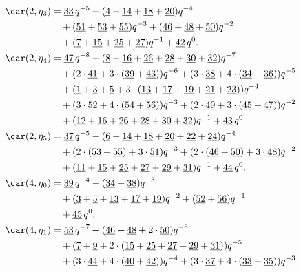 \begin{align*}
	\car(2,\eta_{3})
	&=\underline{33}\,q^{-5}+(\underline{4}+\underline{14}+\underline{18}+\underline{20})q^{-4}\\
	&\quad+(\underline{51}+\underline{53}+\underline{55})q^{-3}+(\underline{46}+\underline{48}+\underline{50})q^{-2}\\
	&\quad+(\underline{7}+\underline{15}+\underline{25}+\underline{27})q^{-1}+\underline{42}\,q^0.\\
	\car(2,\eta_{4})
	&=\underline{47}\,q^{-8}+(\underline{8}+\underline{16}+\underline{26}+\underline{28}+\underline{30}+\underline{32})q^{-7}\\
	&\quad+(2\cdot\underline{41}+3\cdot(\underline{39}+\underline{43}))q^{-6}+(3\cdot\underline{38}+4\cdot(\underline{34}+\underline{36}))q^{-5}\\
	&\quad+(\underline{1}+\underline{3}+\underline{5}+3\cdot(\underline{13}+\underline{17}+\underline{19}+\underline{21}+\underline{23}))q^{-4}\\
	&\quad+(3\cdot\underline{52}+4\cdot(\underline{54}+\underline{56}))q^{-3}+(2\cdot\underline{49}+3\cdot(\underline{45}+\underline{47}))q^{-2}\\
	&\quad+(\underline{12}+\underline{16}+\underline{26}+\underline{28}+\underline{30}+\underline{32})q^{-1}+\underline{43}\,q^0.\\
	\car(2,\eta_{5})
	&=\underline{37}\,q^{-5}+(\underline{6}+\underline{14}+\underline{18}+\underline{20}+\underline{22}+\underline{24})q^{-4}\\
	&\quad+(2\cdot(\underline{53}+\underline{55})+3\cdot\underline{51})q^{-3}+(2\cdot(\underline{46}+\underline{50})+3\cdot\underline{48})q^{-2}\\
	&\quad+(\underline{11}+\underline{15}+\underline{25}+\underline{27}+\underline{29}+\underline{31})q^{-1}+\underline{44}\,q^0.\\
	\car(4,\eta_{0})
	&=\underline{39}\,q^{-4}+(\underline{34}+\underline{38})q^{-3}\\
	&\quad+(\underline{3}+\underline{5}+\underline{13}+\underline{17}+\underline{19})q^{-2}+(\underline{52}+\underline{56})q^{-1}\\
	&\quad+\underline{45}\,q^0.\\
	\car(4,\eta_{1})
	&=\underline{53}\,q^{-7}+(\underline{46}+\underline{48}+2\cdot\underline{50})q^{-6}\\
	&\quad+(\underline{7}+\underline{9}+2\cdot(\underline{15}+\underline{25}+\underline{27}+\underline{29}+\underline{31}))q^{-5}\\
	&\quad+(3\cdot\underline{44}+4\cdot(\underline{40}+\underline{42}))q^{-4}+(3\cdot\underline{37}+4\cdot(\underline{33}+\underline{35}))q^{-3}\\

\end{align*}
